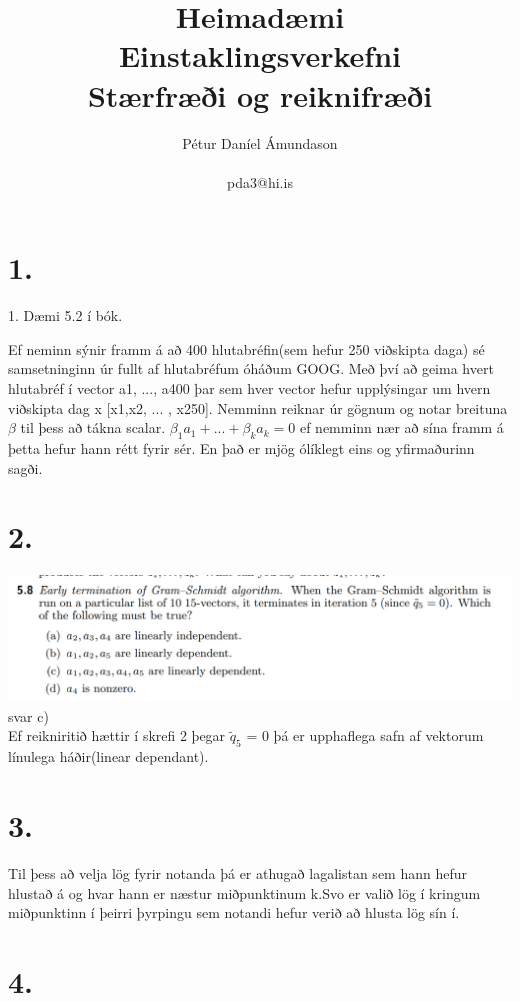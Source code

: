 \documentclass[]{article}
\begin{document}
\title{Heimadæmi  \\ Einstaklingsverkefni \\ Stærfræði og reiknifræði}
\author{Pétur Daníel Ámundason \\ \\ pda3@hi.is}
\maketitle

\section*{1.}

1. Dæmi 5.2 í bók.


Ef neminn sýnir framm á að 400 hlutabréfin(sem hefur 250 viðskipta daga) sé samsetninginn úr fullt af hlutabréfum óháðum GOOG. Með því að geima hvert hlutabréf í vector a1, ..., a400 þar sem hver vector hefur upplýsingar um hvern viðskipta dag x [x1,x2, ... , x250]. Nemminn reiknar úr gögnum og notar breituna $\beta$ til þess að tákna scalar. $\beta_{1}a_{1} + ... + \beta_{k}a_{k } = 0$ ef nemminn nær að sína framm á þetta hefur hann rétt fyrir sér. En það er mjög ólíklegt eins og yfirmaðurinn sagði.

\section*{2.}
\includegraphics[scale=0.5]{d2}
svar c) \\
Ef reikniritið hættir í skrefi 2 þegar   $\tilde{q}_{5}$ = 0 þá er upphaflega safn af vektorum línulega háðir(linear dependant).

\section*{3.}
Til þess að velja lög fyrir notanda þá er athugað lagalistan sem hann hefur hlustað á og hvar hann er næstur miðpunktinum k.Svo er valið lög í kringum miðpunktinn í þeirri þyrpingu sem notandi hefur verið að hlusta lög sín í.

\section*{4.}
\end{document}
